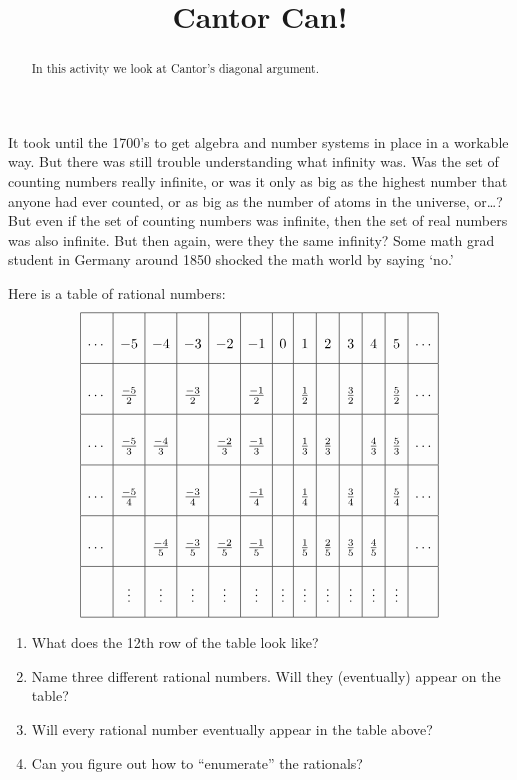 \documentclass{ximera}
\title{Cantor Can!}
\begin{document}
\begin{abstract}
In this activity we look at Cantor's diagonal argument.
\end{abstract}
\maketitle

It took until the 1700's to get algebra and number systems in place in
a workable way.  But there was still trouble understanding what
infinity was.  Was the set of counting numbers really infinite, or was
it only as big as the highest number that anyone had ever counted, or
as big as the number of atoms in the universe, or\dots?  But even if
the set of counting numbers was infinite, then the set of real numbers
was also infinite.  But then again, were they the same infinity?  Some
math grad student in Germany around 1850 shocked the math world by
saying `no.'


\begin{question}
Here is a table of rational numbers:
\[
{\renewcommand{\arraystretch}{3}
\begin{array}{|c|c|c|c|c|c|c|c|c|c|c|c|c|}\hline
\cdots & -5 & -4 & -3 & -2 & -1 & 0 & 1 & 2 & 3 & 4 & 5 & \cdots\\\hline
\cdots &\frac{-5}{2} & & \frac{-3}{2} &  & \frac{-1}{2} &   & \frac{1}{2} &  & \frac{3}{2} &  & \frac{5}{2} & \cdots\\\hline
\cdots & \frac{-5}{3} & \frac{-4}{3} & & \frac{-2}{3} & \frac{-1}{3} & & \frac{1}{3} & \frac{2}{3} & & \frac{4}{3} & \frac{5}{3} & \cdots\\\hline
\cdots & \frac{-5}{4} & & \frac{-3}{4} & & \frac{-1}{4} & & \frac{1}{4} & & \frac{3}{4} & & \frac{5}{4} & \cdots\\\hline
\cdots &  & \frac{-4}{5} & \frac{-3}{5} & \frac{-2}{5} & \frac{-1}{5} & & \frac{1}{5} & \frac{2}{5} & \frac{3}{5} & \frac{4}{5} &  & \cdots\\\hline
       & \vdots & \vdots & \vdots & \vdots & \vdots & \vdots & \vdots & \vdots & \vdots & \vdots & \vdots & \\\hline
\end{array}}
\]
\begin{enumerate}
\item What does the 12th row of the table look like? 
\item Name three different rational numbers. Will they (eventually) appear on the table?
\item Will every rational number eventually appear in the table above?
\item Can you figure out how to ``enumerate'' the rationals?
\end{enumerate}
\end{question}
\end{document}
